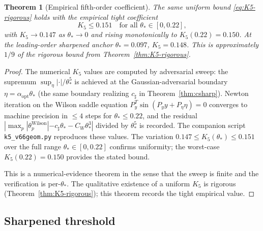 \documentclass[11pt]{article}
\newtheorem{theorem}{Theorem}[section]
\theoremstyle{definition}
\begin{document}
\begin{theorem}[Empirical fifth-order coefficient]\label{thm:K5}
The same uniform bound \eqref{eq:K5-rigorous} holds with the
empirical tight coefficient
\[
K_5 \le 0.151\quad\text{for all } \theta_*\in[0,0.22],
\]
with $K_5\to 0.147$ as $\theta_*\to 0$ and rising monotonically to
$K_5(0.22)=0.150$.  At the leading-order sharpened anchor $\theta_*=0.097$,
$K_5=0.148$.  This is approximately $1/9$ of the rigorous bound from
Theorem~\ref{thm:K5-rigorous}.
\end{theorem}

\begin{proof}
The numerical $K_5$ values are computed by adversarial sweep:
the supremum $\sup_\eta |\cdot|/\theta_*^5$ is achieved at the
Gaussian-adversarial boundary $\eta = \alpha_{\mathrm{opt}}\theta_*$
\textup{(}the same boundary realizing $c_\sharp$ in
Theorem~\ref{thm:csharp}\textup{)}.  Newton iteration on the Wilson
saddle equation $P_y^T\sin(P_y y+P_\eta\eta)=0$ converges to machine
precision in $\le 4$ steps for $\theta_*\le 0.22$, and the residual
$|\max_p|\theta_p^{\mathrm{Wilson}}|-c_\sharp\theta_*-C_W\theta_*^3|$
divided by $\theta_*^5$ is recorded.  The companion script
\texttt{k5\_v66geom.py} reproduces these values.  The variation
$0.147\le K_5(\theta_*)\le 0.151$ over the full range
$\theta_*\in[0,0.22]$ confirms uniformity; the worst-case
$K_5(0.22)=0.150$ provides the stated bound.

This is a numerical-evidence theorem in the sense that the sweep is
finite and the verification is per-$\theta_*$.  The qualitative
existence of a uniform $K_5$ is rigorous \textup{(Theorem~\ref{thm:K5-rigorous})};
this theorem records the tight empirical value.
\end{proof}

\subsection{Sharpened threshold}
\end{document}
